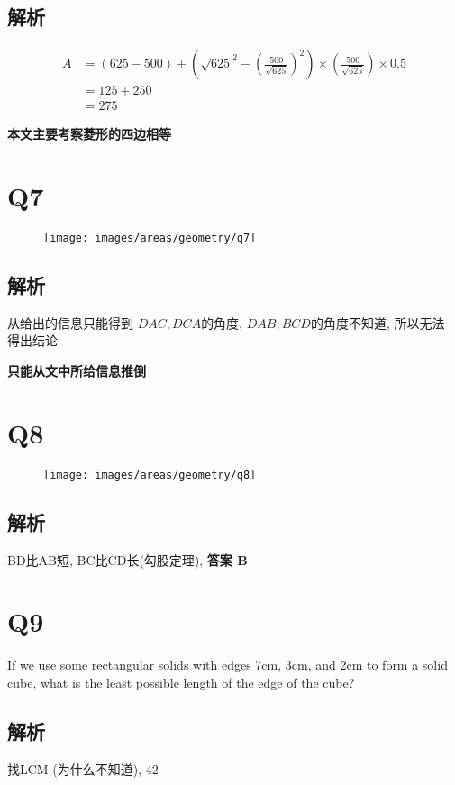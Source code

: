   \subsection{解析}

    \begin{align*}
      A &=
      \left( 625 - 500 \right)
      + \left( \sqrt{625}^{2}
        - \left( \frac{500}{\sqrt{625}} \right)^{2}
        \right)
      \times \left( \frac{500}{\sqrt{625}} \right)
      \times 0.5 \\
      &= 125 + 250 \\
      &= 275
    \end{align*}

    \textbf{本文主要考察菱形的四边相等}

\section{Q7}

  \begin{figure}[H]
    \centering
    \texttt{[image: images/areas/geometry/q7]}
  \end{figure}

  \subsection{解析}

    从给出的信息只能得到 $ DAC, DCA $的角度, $ DAB, BCD $的角度不知道, 所以无法
    得出结论

    \textbf{只能从文中所给信息推倒}

\section{Q8}

  \begin{figure}[H]
    \centering
    \texttt{[image: images/areas/geometry/q8]}
  \end{figure}

  \subsection{解析}

    BD比AB短, BC比CD长(勾股定理), \textbf{答案 B}

\section{Q9}

  If we use some rectangular solids with edges 7cm, 3cm, and 2cm to form a
  solid cube, what is the least possible length of the edge of the cube?

  \subsection{解析}

    找LCM (为什么不知道), $ 42 $
